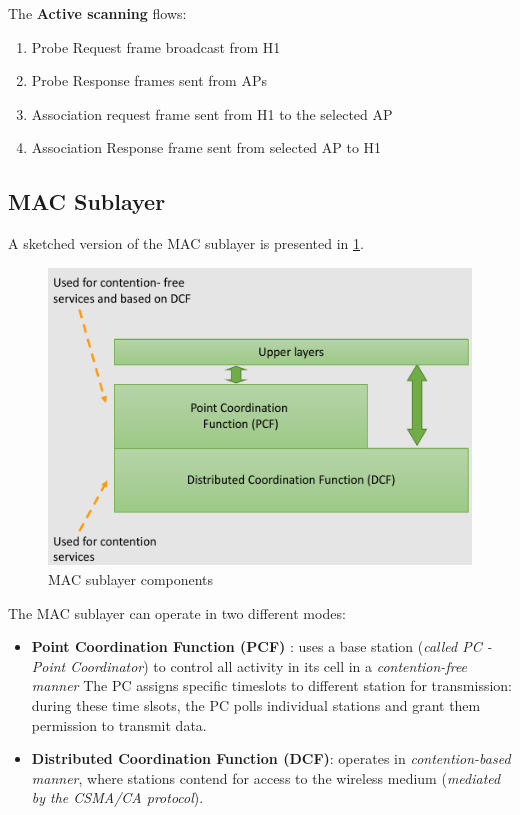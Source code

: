 \documentclass[10pt,a4paper]{report}
\theoremstyle{definition}
\begin{document}
The \textbf{Active scanning} flows:
\begin{enumerate}
	\item 
	Probe Request frame broadcast from H1
	\item 
	Probe Response frames sent from APs
	\item 
	Association request frame sent from H1 to the selected AP
	\item 
	Association Response frame sent from selected AP to H1
\end{enumerate}
\subsection{MAC Sublayer}\label{sec:mac-sublayer}
A sketched version of the MAC sublayer is presented in \ref{mac-sublayer}.
\begin{figure}[h!]
	\centering\includegraphics[scale=0.50]{images/Pasted image 20230301165125.png}
	\caption{MAC sublayer components}
	\label{mac-sublayer}
\end{figure}
The MAC sublayer can operate in two different modes:
\begin{itemize}
	\item 
	\textbf{Point Coordination Function (PCF)} : uses a base station (\textit{called PC - Point Coordinator}) to control all activity in its cell in a \textit{contention-free manner} The PC assigns specific timeslots to different station for transmission: during these time slsots, the PC polls individual stations and grant them permission to transmit data. 
	\item 
	\textbf{Distributed Coordination Function (DCF)}: operates in \textit{contention-based manner}, where stations contend for access to the wireless medium (\textit{mediated by the CSMA/CA protocol}).
\end{itemize}
\end{document}
